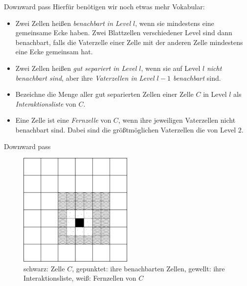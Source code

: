 \documentclass[ngerman]{beamer}
\begin{document}
\begin{frame}{Downward pass}
Hierfür benötigen wir noch etwas mehr Vokabular:
\begin{Definition}
\begin{itemize}
\item Zwei Zellen heißen \emph{benachbart in Level $l$}, wenn sie mindestens eine gemeinsame Ecke haben. Zwei Blattzellen verschiedener Level sind dann benachbart, falls die Vaterzelle einer Zelle mit der anderen Zelle mindestens eine Ecke gemeinsam hat.
\item Zwei Zellen heißen \emph{gut separiert in Level $l$}, wenn sie auf Level $l$ \emph{nicht benachbart sind}, aber ihre \emph{Vaterzellen in Level $l-1$ benachbart} sind.
\item Bezeichne die Menge aller gut separierten Zellen einer Zelle $C$ in Level $l$ als \emph{Interaktionsliste} von $C$.
\item Eine Zelle ist eine \emph{Fernzelle} von $C$, wenn ihre jeweiligen Vaterzellen nicht benachbart sind. Dabei sind die größtmöglichen Vaterzellen die von Level $2$.
\end{itemize}
\end{Definition}
\end{frame}

\begin{frame}{Downward pass}
\begin{figure}
\includegraphics[width=0.5\textwidth]{intlist.png}
\caption{schwarz: Zelle $C$, gepunktet: ihre benachbarten Zellen, \linebreak gewellt: ihre Interaktionsliste, weiß: Fernzellen von $C$}
\end{figure}
\end{frame}
\end{document}
